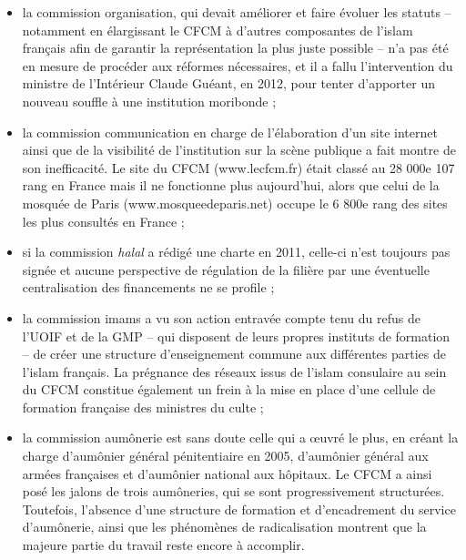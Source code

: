 \begin{itemize}
\item
  la commission organisation, qui devait améliorer et faire évoluer les
  statuts -- notamment en élargissant le CFCM à d'autres composantes de
  l'islam français afin de garantir la représentation la plus juste
  possible -- n'a pas été en mesure de procéder aux réformes
  nécessaires, et il a fallu l'intervention du ministre de l'Intérieur
  Claude Guéant, en 2012, pour tenter d'apporter un nouveau souffle à
  une institution moribonde ;
\item
  la commission communication en charge de l'élaboration d'un site
  internet ainsi que de la visibilité de l'institution sur la scène
  publique a fait montre de son inefficacité. Le site du CFCM
  (www.lecfcm.fr) était classé au 28 000e 107 rang en France mais il ne
  fonctionne plus aujourd'hui, alors que celui de la mosquée de Paris
  (www.mosqueedeparis.net) occupe le 6 800e rang des sites les plus
  consultés en France ;
\item
  si la commission \emph{halal} a rédigé une charte en 2011, celle-ci
  n'est toujours pas signée et aucune perspective de régulation de la
  filière par une éventuelle centralisation des financements ne se
  profile ;
\item
  la commission imams a vu son action entravée compte tenu du refus de
  l'UOIF et de la GMP -- qui disposent de leurs propres instituts de
  formation -- de créer une structure d'enseignement commune aux
  différentes parties de l'islam français. La prégnance des réseaux
  issus de l'islam consulaire au sein du CFCM constitue également un
  frein à la mise en place d'une cellule de formation française des
  ministres du culte ;
\item
  la commission aumônerie est sans doute celle qui a œuvré le plus, en
  créant la charge d'aumônier général pénitentiaire en 2005, d'aumônier
  général aux armées françaises et d'aumônier national aux hôpitaux. Le
  CFCM a ainsi posé les jalons de trois aumôneries, qui se sont
  progressivement structurées. Toutefois, l'absence d'une structure de
  formation et d'encadrement du service d'aumônerie, ainsi que les
  phénomènes de radicalisation montrent que la majeure partie du travail
  reste encore à accomplir.
\end{itemize}

